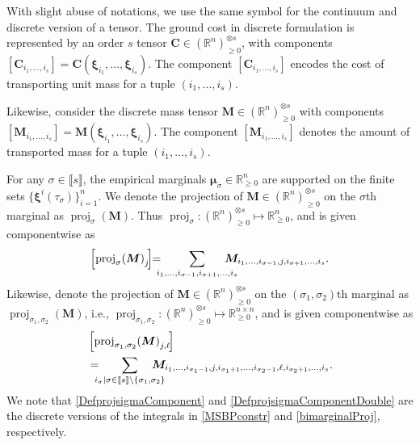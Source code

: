 \documentclass[letterpaper, 10pt, twocolumn]{ieeeconf}      %
\DeclareMathOperator*{\proj}{proj}
\begin{document}
With slight abuse of notations, we use the same symbol for the continuum and discrete version of a tensor. The ground cost in discrete formulation is represented by an order $s$ tensor $\bm{C}\in\left(\mathbb{R}^{n}\right)^{\otimes s}_{\geq 0}$, with components
$\left[\bm{C}_{i_{1},\hdots,i_{s}}\right] = \bm{C}\left(\bm{\xi}_{i_1},\hdots,\bm{\xi}_{i_{s}}\right)$. The component $\left[\bm{C}_{i_{1},\hdots,i_{s}}\right]$ encodes the cost of transporting unit mass for a tuple $(i_1,\hdots,i_s)$.

Likewise, consider the discrete mass tensor $\bm{M}\in\left(\mathbb{R}^{n}\right)^{\otimes s}_{\geq 0}$ with components $\left[\bm{M}_{i_{1},\hdots,i_{s}}\right] = \bm{M}\left(\bm{\xi}_{i_1},\hdots,\bm{\xi}_{i_{s}}\right)$. The component $\left[\bm{M}_{i_{1},\hdots,i_{s}}\right]$ denotes the amount of transported mass for a tuple $(i_1,\hdots,i_s)$.


For any $\sigma\in\llbracket s\rrbracket$, the empirical marginals $\bm{\mu}_{\sigma}\in\mathbb{R}^{n}_{\geq 0}$ are supported on the finite sets $\{\bm{\xi}^{i}(\tau_{\sigma})\}_{i=1}^{n}$. We denote the projection of $\bm{M}\in\left(\mathbb{R}^{n}\right)^{\otimes s}_{\geq 0}$ on the $\sigma$th marginal as $\proj_{\sigma}(\bm{M})$. Thus $\proj_{\sigma}:\left(\mathbb{R}^{n}\right)^{\otimes s}_{\geq 0}\mapsto \mathbb{R}^{n}_{\geq 0}$, and is given componentwise as
\begin{align}
\left[{\rm{proj}}_\sigma \!\left(\bm{M}\right)_{j}\!\right] \!\!=\!\! \!\!\sum_{i_1,\hdots,i_{\sigma-1},i_{\sigma + 1},\hdots, i_s}\!\!\!\!\!\!\!\!\bm{M}_{i_1,\hdots,i_{\sigma-1},j,i_{\sigma + 1},\hdots, i_s}.
\label{DefprojsigmaComponent}
\end{align}
Likewise, denote the projection of $\bm{M}\in\left(\mathbb{R}^{n}\right)^{\otimes s}_{\geq 0}$ on the $(\sigma_1,\sigma_2)$th marginal as $\proj_{\sigma_1,\sigma_2}(\bm{M})$, i.e., $\proj_{\sigma_1,\sigma_2}:\left(\mathbb{R}^{n}\right)^{\otimes s}_{\geq 0}\mapsto \mathbb{R}^{n\times n}_{\geq 0}$, and is given componentwise as
\begin{align}
&\left[{\rm{proj}}_{\sigma_{1},\sigma_{2}} \!\left(\bm{M}\right)_{j,\ell}\!\right]\nonumber\\
&=\!\!\!\!\sum_{i_{\sigma}\mid\sigma\in\llbracket s\rrbracket\setminus\{\sigma_1,\sigma_2\}}\!\!\!\!\!\!\!\!\bm{M}_{i_1,\hdots,i_{\sigma_{1}-1},j,i_{\sigma_{1} + 1},\hdots,i_{\sigma_{2}-1},\ell,i_{\sigma_{2} + 1},\hdots,i_s}.
\label{DefprojsigmaComponentDouble}
\end{align}
We note that \eqref{DefprojsigmaComponent} and \eqref{DefprojsigmaComponentDouble} are the discrete versions of the integrals in \eqref{MSBPconstr} and \eqref{bimarginalProj}, respectively.
\end{document}
